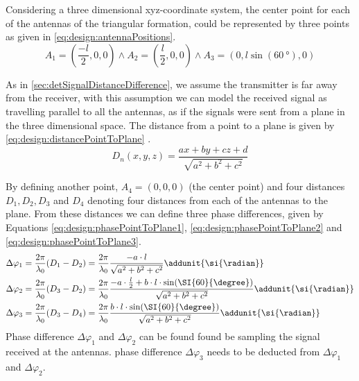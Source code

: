 Considering a three dimensional xyz-coordinate system, the center point for each of the antennas of the triangular formation, could be represented by three points as given in \autoref{eq:design:antennaPositions}.
\begin{equation}
A_1 = \left( \frac{-l}{2},0,0 \right) \wedge A_2 = \left( \frac{l}{2},0,0\right) \wedge A_3 = \left( 0 ,l \sin (\SI{60}{\degree}),0\right)\label{eq:design:antennaPositions}
\end{equation}

As in \autoref{sec:detSignalDistanceDifference}, we assume the transmitter is far away from the receiver, with this assumption we can model the received signal as travelling parallel to all the antennas, as if the signals were sent from a plane in the three dimensional space.
The distance from a point to a plane is given by \autoref{eq:design:distancePointToPlane} \citep{web:PointPlaneDistance}. 
\begin{equation}
D_{n}(x,y,z) = \frac{a x + b y + c z + d}{\sqrt{a^2 + b^2 + c^2}}\label{eq:design:distancePointToPlane}
\end{equation}
\startexplain
{}
\stopexplain

By defining another point, $A_4 = (0,0,0)$ (the center point) and four distances $D_1 , D_2 , D_3$ and $D_4$ denoting four distances from each of the antennas to the plane. From these distances we can define three phase differences, given by Equations \ref{eq:design:phasePointToPlane1}, \ref{eq:design:phasePointToPlane2} and \ref{eq:design:phasePointToPlane3}.
\begin{subequations}
\begin{align} 
\Delta\varphi_1 &=\frac{2\pi}{\lambda_0}(D_1 - D_2) =\frac{2\pi}{\lambda_0} \frac{-a\cdot l}{\sqrt{a^2 + b^2 + c^2}} \addunit{\si{\radian}} \label{eq:design:phasePointToPlane1} \\
\Delta\varphi_2 &=\frac{2\pi}{\lambda_0}(D_3 - D_2) =\frac{2\pi}{\lambda_0} \frac{- a\cdot \frac{l}{2}+b\cdot l \cdot  \sin (\SI{60}{\degree})}{\sqrt{a^2 + b^2 + c^2}} \addunit{\si{\radian}} \label{eq:design:phasePointToPlane2} \\
\Delta\varphi_3&=\frac{2\pi}{\lambda_0}(D_3 - D_4) =\frac{2\pi}{\lambda_0} \frac{ b\cdot l \cdot  \sin (\SI{60}{\degree}) }{\sqrt{a^2 + b^2 + c^2}} \addunit{\si{\radian}} \label{eq:design:phasePointToPlane3} 
\end{align}
\end{subequations} 
\startexplain
{}
\stopexplain
Phase difference $\Delta\varphi_1$ and $\Delta\varphi_2$ can be found found be sampling the signal received at the antennas. phase difference $\Delta\varphi_3$ needs to be deducted from $\Delta\varphi_1$ and $\Delta\varphi_2$. 

